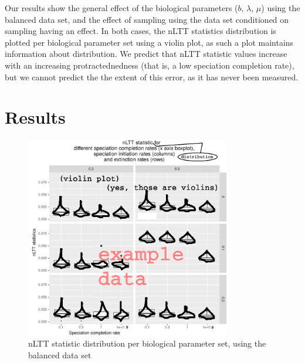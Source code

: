 \documentclass{article}
\begin{document}
Our results show the general effect of the biological 
parameters ($b$, $\lambda$, $\mu$) using the balanced data set,
and the effect of sampling using the data set conditioned on sampling having an effect.
In both cases, the nLTT statistics distribution is plotted per
biological parameter set using a violin plot, as such a plot 
maintains information about distribution.
We predict that nLTT statistic values increase 
with an increasing protractednedness (that is, a low speciation completion rate),
but we cannot predict the the extent of this error, as it has never been 
measured.

\section{Results}

\begin{figure}[!htbp]
  \includegraphics[width=0.8\textwidth]{fig_nltt_stats_per_setup.png}
  \caption{
    nLTT statistic distribution per biological parameter set, using the
    balanced data set
  }
\end{figure}
\end{document}
